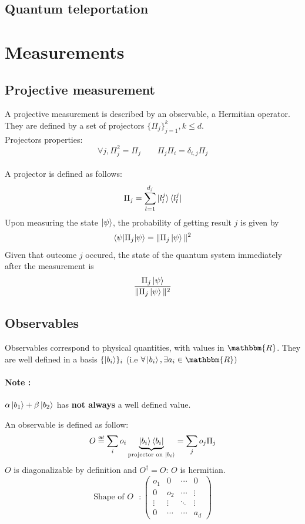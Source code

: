 \documentclass{article}
\newcommand\eqdef{\mathrel{\overset{\makebox[0pt]{\mbox{\normalfont\tiny\sffamily def}}}{=}}}
\begin{document}
\subsection{Quantum teleportation}

\section{Measurements}
\subsection{Projective measurement}
A projective measurement is described by an observable, a Hermitian operator.
They are defined by a set of projectors $\{\Pi_j\}_{j=1}^k, k \leq d$.\\
Projectors properties:
\begin{equation}
    \forall j, \Pi_j^2 = \Pi_j \qquad \Pi_j\Pi_i = \delta_{i,j}\Pi_j
\end{equation}
\\\noindent
A projector is defined as follows:
\begin{equation}
    \Pi_j = \sum_{l=1}^{d_j}\ket{l_l^j}\bra{l_l^j}
\end{equation}
Upon measuring the state $\ket{\psi}$, the probability of getting result $j$ is given by
\begin{equation}
    \braket{\psi|\Pi_j|\psi} = \| \Pi_j\ket{\psi}\|^2
\end{equation}
Given that outcome $j$ occured, the state of the quantum system immediately after the measurement is
\begin{equation}
    \frac{\Pi_j\ket{\psi}}{\| \Pi_j\ket{\psi}\|^2}
\end{equation}

\subsection{Observables}
Observables correspond to physical quantities, with values in $\mathbbm{R}$.
They are well defined in a basis $\{\ket{b_i}\}_i$ (i.e $\forall \ket{b_i}, \exists a_i
\in \mathbbm{R})$

\paragraph{Note :} $\alpha\ket{b_1} + \beta\ket{b_2}$ has \textbf{not always} a well defined value.

An observable is defined as follow:
\begin{equation}
    O \eqdef \sum_i o_i \underbrace{\ket{b_i}\bra{b_i}}_{\text{projector on $\ket{b_i}$}}
    = \sum_j o_j \Pi_j
\end{equation}
$O$ is diagonalizable by definition and $O^\dagger = O$: $O$ is hermitian.
$$
\text{Shape of $O$ } :
\begin{pmatrix}
    o_1 & 0 & \cdots & 0 \\
    0 & o_2 & \cdots & \vdots \\
    \vdots  & \vdots  & \ddots & \vdots  \\
    0 & \cdots & \cdots & a_d
\end{pmatrix}
$$
\end{document}
